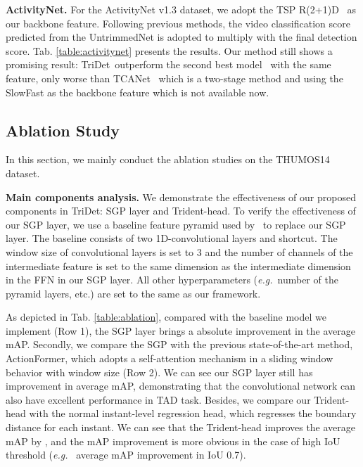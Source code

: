 \documentclass[10pt,twocolumn,letterpaper]{article}
\def\eg{{\em e.g.}}
\newcommand{\tabref}[1]{Tab. \ref{#1}}
\newcommand{\myPara}[1]{\vspace{.05in}\noindent\textbf{#1}}
\def\name{TriDet}
\begin{document}
\myPara{ActivityNet.} For the ActivityNet v1.3 dataset, we adopt the TSP R(2+1)D~\cite{alwassel2021tsp} as our backbone feature. Following previous methods\cite{zhang2022actionformer,cheng2022tallformer, qing2021temporal, liu2022end,lin2021learning}, the video classification score predicted from the UntrimmedNet is adopted to multiply with the final detection score. \tabref{table:activitynet} presents the results. Our method still shows a promising result: \name~outperform the second best model~\cite{zhang2022actionformer} with the same feature, only worse than TCANet~\cite{qing2021temporal} which is a two-stage method and using the SlowFast as the backbone feature which is not available now. 


\subsection{Ablation Study}
In this section, we mainly conduct the ablation studies on the THUMOS14 dataset.

\myPara{Main components analysis.}
We demonstrate the effectiveness of our proposed components in \name: SGP layer and Trident-head. To verify the effectiveness of our SGP layer, we use a baseline feature pyramid used by~\cite{lin2021learning, zhang2022actionformer} to replace our SGP layer. The baseline consists of two 1D-convolutional layers and shortcut. The window size of convolutional layers is set to 3 and the number of channels of the intermediate feature is set to the same dimension as the intermediate dimension in the FFN in our SGP layer. All other hyperparameters (\eg~number of the pyramid layers, etc.) are set to the same as our framework.

As depicted in \tabref{table:ablation}, compared with the baseline model we implement (Row 1), the SGP layer brings a  absolute improvement in the average mAP. Secondly, we compare the SGP with the previous state-of-the-art method, ActionFormer, which adopts a self-attention mechanism in a sliding window behavior\cite{beltagy2020longformer} with window size  (Row 2). We can see our SGP layer still has  improvement in average mAP, demonstrating that the convolutional network can also have excellent performance in TAD task. Besides, we compare our Trident-head with the normal instant-level regression head, which regresses the boundary distance for each instant. We can see that the Trident-head improves the average mAP by , and the mAP improvement is more obvious in the case of high IoU threshold (\eg~ average mAP improvement in IoU 0.7). 
\end{document}
